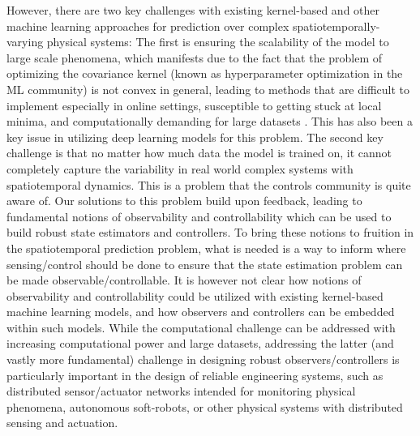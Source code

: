 However, there are two key challenges with existing kernel-based and other machine learning approaches for prediction over complex spatiotemporally-varying physical systems: The first is ensuring the scalability of the model to large scale phenomena, which manifests due to the fact that the problem of optimizing the covariance kernel (known as hyperparameter optimization in the ML community) is not convex in general, leading to methods that are difficult to implement especially in online settings, susceptible to getting stuck at local minima, and computationally demanding for large datasets \cite{sra2012optimization}. This has also been a key issue in utilizing deep learning models for this problem. %
The second key challenge is that no matter how much data the model is trained on, it cannot completely capture the variability in real world complex systems with spatiotemporal dynamics. This is a problem that the controls community is quite aware of. Our solutions to this problem build upon feedback, leading to fundamental notions of observability and controllability which can be used to build robust state estimators and controllers. To bring these notions to fruition in the spatiotemporal prediction problem, what is needed is a way to inform where sensing/control should be done to ensure that the state estimation problem can be made observable/controllable. %
It is however not clear how notions of observability and controllability could be utilized with existing kernel-based machine learning models, and how observers and controllers can be embedded within such models. %
While the computational challenge can be addressed with increasing computational power and large datasets, addressing the latter (and vastly more fundamental) challenge in designing robust observers/controllers is particularly important in the design of reliable engineering systems, such as distributed sensor/actuator networks intended for monitoring physical phenomena, autonomous soft-robots, or other physical systems with distributed sensing and actuation.  %
% 
   
